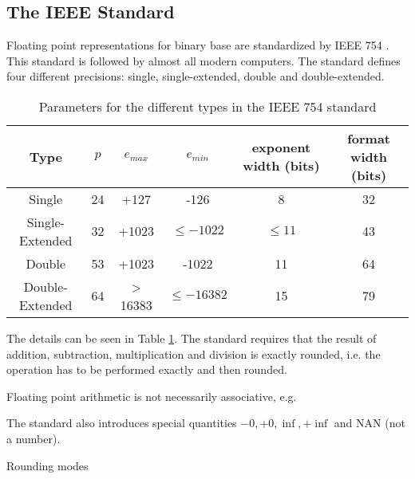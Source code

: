 \subsection{The IEEE Standard}
	Floating point representations for binary base are standardized by IEEE 754 \cite{ieee}. 
	This standard is followed by almost all modern computers.
	The standard defines four different precisions: single, single-extended, double and double-extended.
	  \begin{table}
	  	\centering
	    \begin{tabular}{ | c || c | c | c | c | c | }
	    \hline
	    Type & $p$ & $e_{max}$ & $e_{min}$ & exponent width (bits) & format width (bits) \\ \hline \hline
	    Single & 24 & +127 & -126 & 8 & 32 \\ \hline
	    Single-Extended & 32 & +1023 & $\leq -1022$ & $\leq 11$ & 43 \\ \hline
	    Double & 53 & +1023 & -1022 & 11 & 64 \\ \hline
	    Double-Extended & 64 & > 16383 & $\leq -16382$ & 15 & 79 \\ \hline
	    \end{tabular}
	    \caption{Parameters for the different types in the IEEE 754 standard}\label{table:IEEE floating point}
	  \end{table}
	  
	The details can be seen in Table \ref{table:IEEE floating point}.
	The standard requires that the result of addition, subtraction, multiplication and division is exactly rounded, 
	i.e. the operation has to be performed exactly and then rounded.

	Floating point arithmetic is not necessarily associative, e.g.

	The standard also introduces special quantities $-0, +0, \inf, +\inf$ and NAN (not a number). 

	Rounding modes

	


